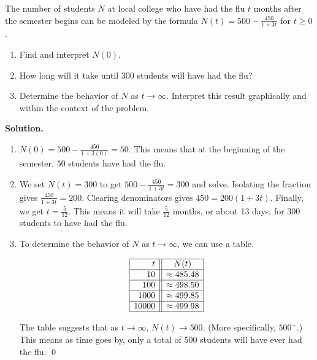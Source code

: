 \begin{ex}  The number of students $N$ at local college who have had the flu $t$ months after the semester begins can be modeled by the formula $N(t) = 500 - \frac{450}{1+3t}$ for $t \geq 0$.

\begin{enumerate}

\item  Find and interpret $N(0)$.

\item  How long will it take until $300$ students will have had the flu?

\item  Determine the behavior of $N$ as $t \rightarrow \infty$.  Interpret this result graphically and within the context of the problem. 

\end{enumerate}

{ \bf Solution.}

\begin{enumerate}

\item  $N(0) = 500 - \frac{450}{1+3(0)} = 50$.  This means that at the beginning of the semester, $50$ students have had the flu.

\item  We set $N(t) = 300$ to get $500 - \frac{450}{1+3t} = 300$ and solve.  Isolating the fraction gives $\frac{450}{1+3t} = 200$.  Clearing denominators gives $450 = 200(1+3t)$.  Finally, we get $t = \frac{5}{12}$.  This means it will take $\frac{5}{12}$ months, or about 13 days, for $300$ students to have had the flu.

\item  To determine the behavior of $N$ as $t\rightarrow \infty$, we can use a table. 


\[\begin{array}{|r||c|}  \hline

  t & N(t)  \\ \hline
 10 & \approx 485.48  \\  \hline
 100& \approx 498.50  \\  \hline
 1000 &  \approx 499.85  \\  \hline
  10000 & \approx 499.98  \\  \hline
  \end{array}\]
  
The table suggests that as $t \rightarrow \infty$, $N(t) \rightarrow 500$. (More specifically, $500^{-}$.)  This means as time goes by, only a total of 500 students will have ever had the flu. \qed

\end{enumerate}

\end{ex}

